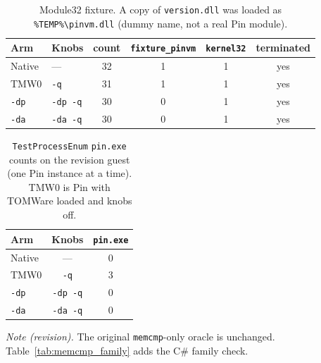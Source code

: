 \begin{table}[t]
\caption{Module32 fixture. A copy of \texttt{version.dll} was loaded as \texttt{\%TEMP\%\textbackslash pinvm.dll} (dummy name, not a real Pin module).}
\label{tab:module32_fixture}
\centering
\small
\begin{tabular}{llcccc}
\toprule
\textbf{Arm} & \textbf{Knobs} & \textbf{count} & \texttt{fixture\_pinvm} & \texttt{kernel32} & \textbf{terminated} \\
\midrule
Native & --- & 32 & 1 & 1 & yes \\
TMW0 & \texttt{-q} & 31 & 1 & 1 & yes \\
\texttt{-dp} & \texttt{-dp -q} & 30 & 0 & 1 & yes \\
\texttt{-da} & \texttt{-da -q} & 30 & 0 & 1 & yes \\
\bottomrule
\end{tabular}
\end{table}

\begin{table}[t]
\caption{\texttt{TestProcessEnum} \texttt{pin.exe} counts on the revision guest (one Pin instance at a time). TMW0 is Pin with TOMWare loaded and knobs off.}
\label{tab:processenum_pin_counts}
\centering
\small
\begin{tabular}{lcc}
\toprule
\textbf{Arm} & \textbf{Knobs} & \texttt{pin.exe} \\
\midrule
Native & --- & 0 \\
TMW0 & \texttt{-q} & 3 \\
\texttt{-dp} & \texttt{-dp -q} & 0 \\
\texttt{-da} & \texttt{-da -q} & 0 \\
\bottomrule
\end{tabular}
\end{table}

\textit{Note (revision).} The original \texttt{memcmp}-only oracle is unchanged. Table~\ref{tab:memcmp_family} adds the C\# family check.

